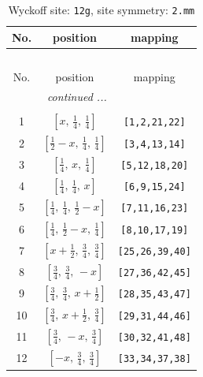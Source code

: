\documentclass[fleqn,8pt]{jsarticle}
\begin{document}
\begin{longtable}{ccc}
\caption{Wyckoff site: {\tt 12g}, site symmetry: {\tt 2.mm}}
 \\
 \hline \hline
No. & position & mapping \\ \hline \endfirsthead

\multicolumn{2}{l}{\tablename\ \thetable{}} \\
 \hline \hline
No. & position & mapping \\ \hline \endhead

 \hline \hline
\multicolumn{2}{r}{\footnotesize\it continued ...} \\ \endfoot

 \hline \hline
\multicolumn{2}{r}{} \\ \endlastfoot

1 & $\left[ x,\, \frac{1}{4},\, \frac{1}{4} \right]$ & {\tt [1,2,21,22]} \\ \hline
2 & $\left[ \frac{1}{2} - x,\, \frac{1}{4},\, \frac{1}{4} \right]$ & {\tt [3,4,13,14]} \\ \hline
3 & $\left[ \frac{1}{4},\, x,\, \frac{1}{4} \right]$ & {\tt [5,12,18,20]} \\ \hline
4 & $\left[ \frac{1}{4},\, \frac{1}{4},\, x \right]$ & {\tt [6,9,15,24]} \\ \hline
5 & $\left[ \frac{1}{4},\, \frac{1}{4},\, \frac{1}{2} - x \right]$ & {\tt [7,11,16,23]} \\ \hline
6 & $\left[ \frac{1}{4},\, \frac{1}{2} - x,\, \frac{1}{4} \right]$ & {\tt [8,10,17,19]} \\ \hline
7 & $\left[ x + \frac{1}{2},\, \frac{3}{4},\, \frac{3}{4} \right]$ & {\tt [25,26,39,40]} \\ \hline
8 & $\left[ \frac{3}{4},\, \frac{3}{4},\, - x \right]$ & {\tt [27,36,42,45]} \\ \hline
9 & $\left[ \frac{3}{4},\, \frac{3}{4},\, x + \frac{1}{2} \right]$ & {\tt [28,35,43,47]} \\ \hline
10 & $\left[ \frac{3}{4},\, x + \frac{1}{2},\, \frac{3}{4} \right]$ & {\tt [29,31,44,46]} \\ \hline
11 & $\left[ \frac{3}{4},\, - x,\, \frac{3}{4} \right]$ & {\tt [30,32,41,48]} \\ \hline
12 & $\left[ - x,\, \frac{3}{4},\, \frac{3}{4} \right]$ & {\tt [33,34,37,38]} \\
\end{longtable}
\renewcommand{\arraystretch}{1.2}
\end{document}
